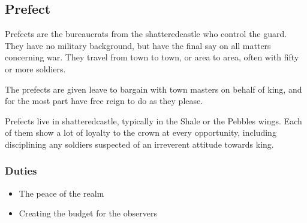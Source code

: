 \begin{multicols}{2}
\subsection{Prefect}

Prefects are the bureaucrats from the \gls{shatteredcastle} who control the \gls{guard}.
They have no military background, but have the final say on all matters concerning war.
They travel from town to town, or area to area, often with fifty or more soldiers.

The prefects are given leave to bargain with town masters on behalf of \gls{king}, and for the most part have free reign to do as they please.

Prefects live in \gls{shatteredcastle}, typically in the Shale or the Pebbles wings.
Each of them show a lot of loyalty to the crown at every opportunity, including disciplining any soldiers suspected of an irreverent attitude towards \gls{king}.

\subsubsection{Duties}

\begin{itemize}

  \item{The peace of the realm}
  \item{Creating the budget for the observers}

\end{itemize}

\end{multicols}
